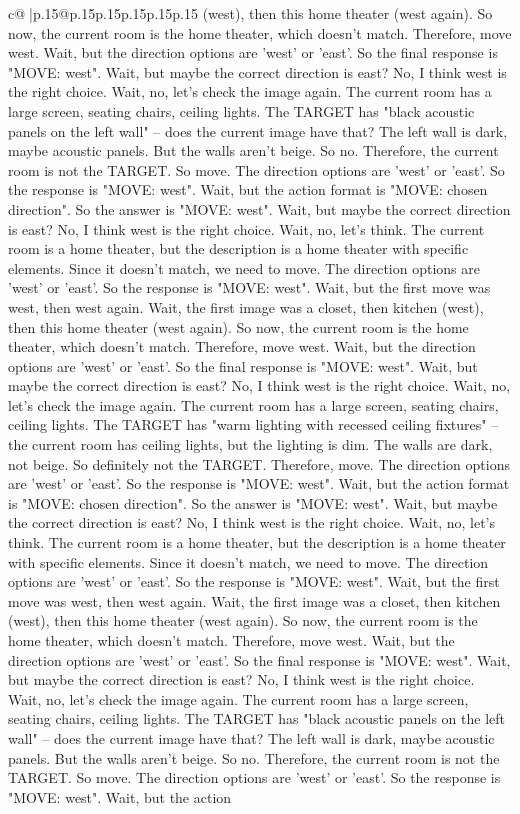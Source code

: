 \documentclass{article}
\begin{document}
{\begin{supertabular}{c@{$\;$}|p{.15\linewidth}@{}p{.15\linewidth}p{.15\linewidth}p{.15\linewidth}p{.15\linewidth}p{.15\linewidth}}
{{{(west), then this home theater (west again). So now, the current room is the home theater, which doesn't match. Therefore, move west. Wait, but the direction options are 'west' or 'east'. So the final response is "MOVE: west". Wait, but maybe the correct direction is east? No, I think west is the right choice. Wait, no, let's check the image again. The current room has a large screen, seating chairs, ceiling lights. The TARGET has "black acoustic panels on the left wall" – does the current image have that? The left wall is dark, maybe acoustic panels. But the walls aren't beige. So no. Therefore, the current room is not the TARGET. So move. The direction options are 'west' or 'east'. So the response is "MOVE: west". Wait, but the action format is "MOVE: chosen direction". So the answer is "MOVE: west". Wait, but maybe the correct direction is east? No, I think west is the right choice. Wait, no, let's think. The current room is a home theater, but the description is a home theater with specific elements. Since it doesn't match, we need to move. The direction options are 'west' or 'east'. So the response is "MOVE: west". Wait, but the first move was west, then west again. Wait, the first image was a closet, then kitchen (west), then this home theater (west again). So now, the current room is the home theater, which doesn't match. Therefore, move west. Wait, but the direction options are 'west' or 'east'. So the final response is "MOVE: west". Wait, but maybe the correct direction is east? No, I think west is the right choice. Wait, no, let's check the image again. The current room has a large screen, seating chairs, ceiling lights. The TARGET has "warm lighting with recessed ceiling fixtures" – the current room has ceiling lights, but the lighting is dim. The walls are dark, not beige. So definitely not the TARGET. Therefore, move. The direction options are 'west' or 'east'. So the response is "MOVE: west". Wait, but the action format is "MOVE: chosen direction". So the answer is "MOVE: west". Wait, but maybe the correct direction is east? No, I think west is the right choice. Wait, no, let's think. The current room is a home theater, but the description is a home theater with specific elements. Since it doesn't match, we need to move. The direction options are 'west' or 'east'. So the response is "MOVE: west". Wait, but the first move was west, then west again. Wait, the first image was a closet, then kitchen (west), then this home theater (west again). So now, the current room is the home theater, which doesn't match. Therefore, move west. Wait, but the direction options are 'west' or 'east'. So the final response is "MOVE: west". Wait, but maybe the correct direction is east? No, I think west is the right choice. Wait, no, let's check the image again. The current room has a large screen, seating chairs, ceiling lights. The TARGET has "black acoustic panels on the left wall" – does the current image have that? The left wall is dark, maybe acoustic panels. But the walls aren't beige. So no. Therefore, the current room is not the TARGET. So move. The direction options are 'west' or 'east'. So the response is "MOVE: west". Wait, but the action }}}
\end{supertabular}}
\end{document}
